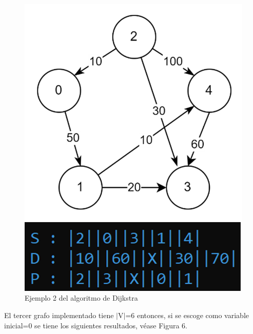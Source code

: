 \documentclass[12pt,twoside]{article}
\begin{document}
    \begin{figure}[H]
        \centering
        \includegraphics{imagenes/Imagen2.png}
        \caption{Ejemplo 2 del algoritmo de Dijkstra}
    \end{figure}
    El tercer grafo implementado tiene $|$V$|$=6 entonces, si se escoge como variable inicial=0 se tiene los siguientes resultados, v\'ease Figura 6.
\end{document}
